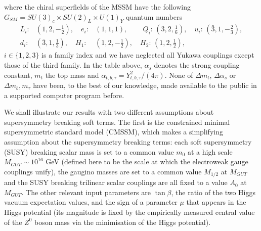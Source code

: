 \documentclass[final,3p,times,pdflatex]{elsarticle}
\begin{document}
where the chiral superfields of the MSSM have the 
following $G_{SM}=SU(3)_c\times SU(2)_L\times U(1)_Y$ quantum numbers
\begin{eqnarray}
L_i:&(1,2,-\frac{1}{2}),\quad {e}_i:&(1,1,1),\qquad\, Q_i:\,(3,2,\frac{1}{6}),\quad
{u}_i:\,({\bar 3},1,-\frac{2}{3}),\nonumber\\ {d}_i:&({\bar
  3},1,\frac{1}{3}),\quad 
H_1:&(1,2,-\frac{1}{2}),\quad  H_2:\,(1,2,\frac{1}{2}),
\label{fields}
\end{eqnarray}
$i \in \{ 1,2,3\}$ is a family index and we have neglected all Yukawa
couplings except those of the third family.
In the table above, $\alpha_s$ denotes the strong coupling constant, $m_t$ the
top mass and
$\alpha_{t,b,\tau}=Y_{t,b,\tau}^2 / (4 \pi)$. 
None of $\Delta m_t$, $\Delta \alpha_s$ or $\Delta m_b, m_\tau$ have been, to
the best of our knowledge, made available to the public in a supported
computer program before. 



We shall illustrate our results with two different assumptions about
supersymmetry breaking soft terms. The first is the
constrained minimal supersymmetric standard model (CMSSM), which makes a
simplifying 
assumption about the supersymmetry breaking terms: each soft supersymmetry
(SUSY) breaking
scalar mass is set to a common value $m_0$ at a high scale $M_{GUT}\sim
10^{16}$ GeV (defined
here to be the scale at which the electroweak gauge couplings unify), the
gaugino masses are set to a common value $M_{1/2}$ at $M_{GUT}$ and the 
SUSY breaking trilinear scalar couplings are all fixed to a value $A_0$ at
$M_{GUT}$. The other relevant input parameters are $\tan \beta$, the ratio of the
two Higgs vacuum expectation values, and the sign of a parameter $\mu$ that
appears in the Higgs potential (its magnitude is fixed by the empirically
measured central value of 
the $Z^0$ boson mass via the minimisation of 
the 
Higgs potential). 
\end{document}
